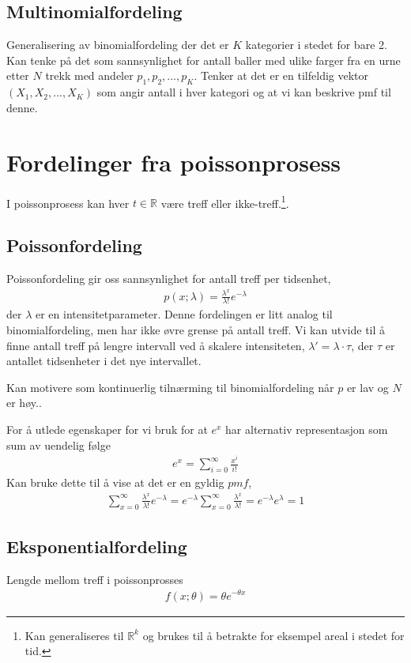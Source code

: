 \subsection{Multinomialfordeling}
Generalisering av binomialfordeling der det er $K$ kategorier i stedet for bare 2. Kan tenke på det som sannsynlighet for antall baller med ulike farger fra en urne etter $N$ trekk med andeler $p_1,p_2,...,p_K$. Tenker at det er en tilfeldig vektor $(X_1, X_2, ..., X_K)$ som angir antall i hver kategori og at vi kan beskrive pmf til denne. 
\section{Fordelinger fra poissonprosess}
I poissonprosess kan hver $t\in \mathbb{R}$ være treff eller ikke-treff.\footnote{Kan generaliseres til $\mathbb{R}^k$ og brukes til å betrakte for eksempel areal i stedet for tid.}. 
\subsection{Poissonfordeling}
Poissonfordeling gir oss sannsynlighet for antall treff per tidsenhet,
\begin{align}
p(x;\lambda) = \frac{\lambda^x}{\lambda!}e^{-\lambda}
\end{align}
der $\lambda$ er en intensitetparameter. Denne fordelingen er litt analog til binomialfordeling, men har ikke øvre grense på antall treff. Vi kan utvide til å finne antall treff på lengre intervall ved å skalere intensiteten, $\lambda'=\lambda\cdot \tau$, der $\tau$ er antallet tidsenheter i det nye intervallet. 

Kan motivere som kontinuerlig tilnærming til binomialfordeling når $p$ er lav og $N$ er høy.. 

For å utlede egenskaper for vi bruk for at $e^x$ har alternativ representasjon som sum av uendelig følge
\begin{align}
e^x=\sum_{i=0}^{\infty}\frac{x^i}{i!}
\end{align}
Kan bruke dette til å vise at det er en gyldig $pmf$,
\begin{align}
\sum_{x=0}^{\infty}\frac{\lambda^x}{\lambda!}e^{-\lambda} = e^{-\lambda}\sum_{x=0}^{\infty}\frac{\lambda^x}{\lambda!}=e^{-\lambda}e^{\lambda}=1
\end{align}
\subsection{Eksponentialfordeling}
Lengde mellom treff i poissonprosses
\begin{align}
f(x;\theta) = \theta e^{-\theta x}
\end{align}
